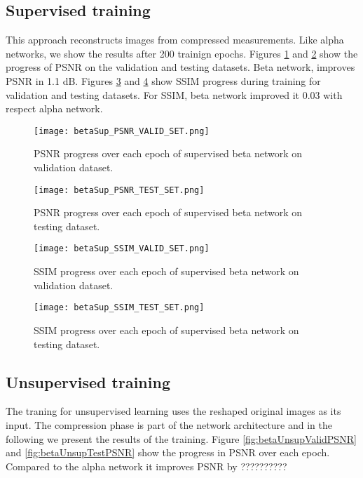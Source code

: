 \subsection{Supervised training}
This approach reconstructs images from compressed measurements. Like alpha networks, we show the results after 200 trainign epochs. Figures \ref{fig:betaSupValidPSNR} and \ref{fig:betaSupTestPSNR} show the progress of PSNR on the validation and testing datasets. Beta network, improves PSNR in 1.1 dB. Figures \ref{fig:betaSupValidSSIM} and \ref{fig:betaSupTestSSIM} show SSIM progress during training for validation and testing datasets. For SSIM, beta network improved it 0.03 with respect alpha network.  
\begin{figure}[tb] 
\centering 
\texttt{[image: betaSup\_PSNR\_VALID\_SET.png]} 
\caption[PSNR validation progress during training of supervised beta network]{PSNR progress over each epoch of supervised beta network on validation dataset.}
\label{fig:betaSupValidPSNR} 
\end{figure}  

\begin{figure}[tb]
\centering 
\texttt{[image: betaSup\_PSNR\_TEST\_SET.png]} 
\caption[PSNR testing progress during training of supervised beta network]{PSNR progress over each epoch of supervised beta network on testing dataset.}
\label{fig:betaSupTestPSNR} 
\end{figure}  

\begin{figure}[tb] 
\centering 
\texttt{[image: betaSup\_SSIM\_VALID\_SET.png]} 
\caption[SSIM validation progress during training of supervised beta network]{SSIM progress over each epoch of supervised beta network on validation dataset.}
\label{fig:betaSupValidSSIM} 
\end{figure}  

\begin{figure}[tb] 
\centering 
\texttt{[image: betaSup\_SSIM\_TEST\_SET.png]} 
\caption[SSIM testing progress during training of supervised beta network]{SSIM progress over each epoch of supervised beta network on testing dataset.}
\label{fig:betaSupTestSSIM} 
\end{figure}  

\FloatBarrier

\subsection{Unsupervised training}
The traning for unsupervised learning uses the reshaped original images as its input. The compression phase is part of the network architecture and in the following we present the results of the training. Figure \ref{fig:betaUnsupValidPSNR} and \ref{fig:betaUnsupTestPSNR} show the progress in PSNR over each epoch. Compared to the alpha network it improves PSNR by ??????????   

